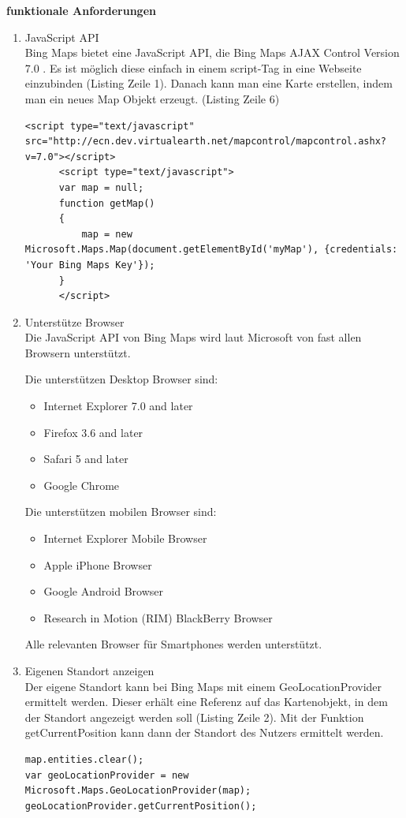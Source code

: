 \textbf{funktionale Anforderungen}
\begin{enumerate}
\item JavaScript API\\
Bing Maps bietet eine JavaScript API, die \glqq Bing Maps AJAX Control Version 7.0 \grqq. Es ist möglich diese einfach in einem script-Tag in eine Webseite einzubinden (Listing Zeile 1). Danach kann man eine Karte erstellen, indem man ein neues Map Objekt erzeugt. (Listing Zeile 6) 
\begin{lstlisting}
<script type="text/javascript" src="http://ecn.dev.virtualearth.net/mapcontrol/mapcontrol.ashx?v=7.0"></script>
      <script type="text/javascript">
      var map = null;
      function getMap()
      {
          map = new Microsoft.Maps.Map(document.getElementById('myMap'), {credentials: 'Your Bing Maps Key'});
      }   
      </script>
\end{lstlisting} \cite[Codebeispiel CreateMap1]{bingmaps}


\item Unterstütze Browser\\
Die JavaScript API von Bing Maps wird laut Microsoft von fast allen Browsern unterstützt. 

Die unterstützen Desktop Browser sind:

\glqq
\begin{itemize}
\item Internet Explorer 7.0 and later
\item Firefox 3.6 and later
\item Safari 5 and later
\item Google Chrome
\end{itemize}

Die unterstützen mobilen Browser sind:
\begin{itemize}
\item Internet Explorer Mobile Browser
\item Apple iPhone Browser
\item Google Android Browser
\item Research in Motion (RIM) BlackBerry Browser
\end{itemize}
\grqq \cite{microsoftbrowser}

Alle relevanten Browser für Smartphones werden unterstützt.

\item Eigenen Standort anzeigen\\
Der eigene Standort kann bei Bing Maps mit einem \glqq GeoLocationProvider \grqq ermittelt werden. Dieser erhält eine Referenz auf das Kartenobjekt, in dem der Standort angezeigt werden soll (Listing Zeile 2). Mit der Funktion \glqq getCurrentPosition \grqq kann dann der Standort des Nutzers ermittelt werden.
\begin{lstlisting}
map.entities.clear(); 
var geoLocationProvider = new Microsoft.Maps.GeoLocationProvider(map);  
geoLocationProvider.getCurrentPosition(); 
\end{lstlisting}\cite[Codebeispiel GetUserLocation1]{bingmaps}


\end{enumerate}
